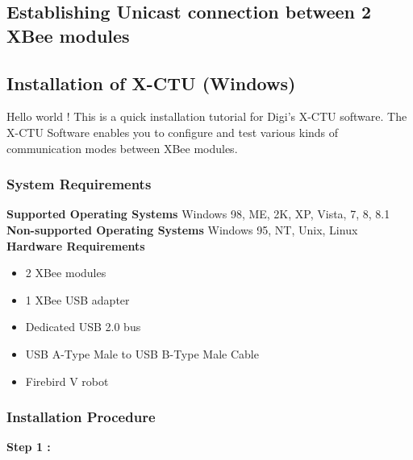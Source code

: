 




\begin{flushleft}

\chapter{Establishing Unicast connection between 2 XBee modules}


\medskip
\section{\textbf{Installation of X-CTU (Windows)}}
\medskip
Hello world ! This is a quick installation tutorial for Digi's X-CTU software.
The X-CTU Software enables you to configure and test various kinds of communication modes between XBee modules.
\medskip
\subsection{\textbf{ System Requirements}}
\medskip
\textbf{Supported Operating Systems}
Windows 98, ME, 2K, XP, Vista, 7, 8, 8.1
\medskip
\textbf{Non-supported Operating Systems}
Windows 95, NT, Unix, Linux
\medskip
\textbf{Hardware Requirements}
\medskip
\begin{itemize}
\item 2 XBee modules
\item 1 XBee USB adapter 
\item Dedicated USB 2.0 bus
\item USB A-Type Male to USB B-Type Male Cable
\item Firebird V robot
\end{itemize}
\medskip

\subsection{\textbf{ Installation Procedure}}
\textbf{Step 1 :}

\medskip



\end{flushleft}
